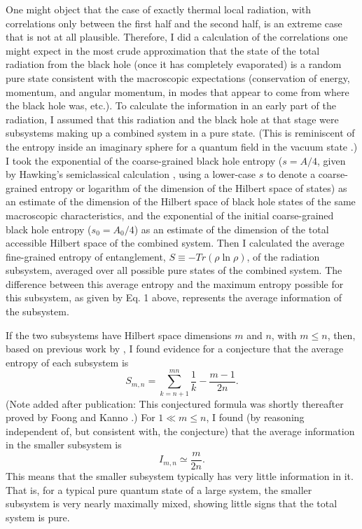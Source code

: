 \documentclass[12pt]{article}
\begin{document}
     One might object that the case of exactly thermal local
radiation, with
correlations only between the first half and the second half, is an
extreme
case that is not at all plausible.  Therefore, I did a calculation
\cite{Paginfo} of the
correlations one might expect in the most crude approximation that
the state of
the total radiation from the black hole (once it has completely
evaporated) is
a random pure state consistent with the macroscopic expectations
(conservation
of energy, momentum, and angular momentum, in modes that appear to
come from
where the black hole was, etc.).  To calculate the information in an
early part
of the radiation, I assumed that this radiation and the black hole at
that
stage were subsystems making up a combined system in a pure state.
(This is reminiscent of the entropy inside an imaginary sphere
for a quantum field in the vacuum state \cite{Bom,Sred93}.)  I took
the
exponential of the coarse-grained black hole entropy ($s=A/4$, given
by
Hawking's semiclassical calculation \cite{Haw75,Haw76a},
using a lower-case $s$ to
denote a coarse-grained entropy or logarithm of the dimension of the
Hilbert
space of states) as an estimate of the dimension of the Hilbert space
of black
hole states of the same macroscopic characteristics, and the
exponential of the
initial coarse-grained black hole entropy ($s_0=A_0/4$) as an
estimate of the
dimension of the total accessible Hilbert space of the combined
system.  Then I
calculated the average fine-grained entropy of entanglement,
$S\equiv-Tr(\rho\ln\rho)$, of the
radiation subsystem, averaged over all possible pure states of the
combined
system.  The difference between this average entropy and the maximum
entropy
possible for this subsystem, as given by Eq. 1 above, represents the
average
information of the subsystem.

     If the two subsystems have Hilbert space dimensions $m$ and $n$,
with
$m\leq n$, then, based on previous work by \cite{Lub,Llo}, I found
\cite{PagEnt}
evidence for a conjecture that the average entropy of each subsystem
is
     	\begin{equation}
	S_{m,n}=\sum_{k=n+1}^{mn}\frac{1}{k} - \frac{m-1}{2n}.
	\end{equation}
(Note added after publication:  This conjectured formula was shortly
thereafter proved by Foong and Kanno \cite{FooKan}.)
For $1\ll m\leq n$, I found (by reasoning independent of, but
consistent with,
the conjecture) that the average information in the smaller subsystem
is
	\begin{equation}
	I_{m,n} \simeq \frac{m}{2n}.
	\end{equation}
This means that the smaller subsystem typically has very little
information in
it.  That
is, for a typical pure quantum state of a large system, the smaller
subsystem
is very nearly maximally mixed, showing little signs that the total
system is
pure.
\end{document}
